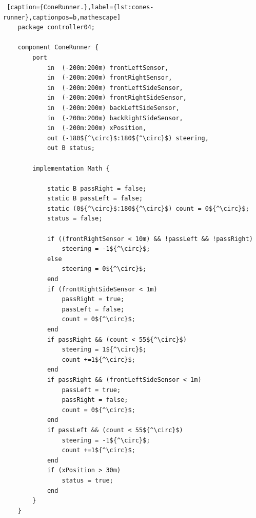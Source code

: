 \begin{minipage}{\linewidth}
\begin{lstlisting} [caption={ConeRunner.},label={lst:cones-runner},captionpos=b,mathescape]
    package controller04;

    component ConeRunner {
        port
            in  (-200m:200m) frontLeftSensor,
            in  (-200m:200m) frontRightSensor,
            in  (-200m:200m) frontLeftSideSensor,
            in  (-200m:200m) frontRightSideSensor,
            in  (-200m:200m) backLeftSideSensor,
            in  (-200m:200m) backRightSideSensor,
            in  (-200m:200m) xPosition,
            out (-180${^\circ}$:180${^\circ}$) steering,
            out B status;
    
        implementation Math {

            static B passRight = false;
            static B passLeft = false;
            static (0${^\circ}$:180${^\circ}$) count = 0${^\circ}$;
            status = false;
            
            if ((frontRightSensor < 10m) && !passLeft && !passRight)
                steering = -1${^\circ}$;
            else
                steering = 0${^\circ}$;
            end          
            if (frontRightSideSensor < 1m)
                passRight = true;
                passLeft = false;
                count = 0${^\circ}$;
            end
            if passRight && (count < 55${^\circ}$)
                steering = 1${^\circ}$;
                count +=1${^\circ}$;
            end
            if passRight && (frontLeftSideSensor < 1m)
                passLeft = true;
                passRight = false;
                count = 0${^\circ}$;
            end
            if passLeft && (count < 55${^\circ}$)
                steering = -1${^\circ}$;
                count +=1${^\circ}$;
            end
            if (xPosition > 30m)
                status = true;
            end
        }
    }
\end{lstlisting}
\end{minipage}
